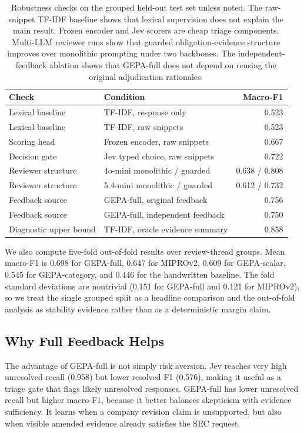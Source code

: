 \documentclass[11pt]{article}
\begin{document}
\begin{table}[t]
\centering
\scriptsize
\setlength{\tabcolsep}{3pt}
\begin{tabular}{llr}
\toprule
\textbf{Check} & \textbf{Condition} & \textbf{Macro-F1} \\
\midrule
Lexical baseline & TF-IDF, response only & 0.523 \\
Lexical baseline & TF-IDF, raw snippets & 0.523 \\
Scoring head & Frozen encoder, raw snippets & 0.667 \\
Decision gate & Jev typed choice, raw snippets & 0.722 \\
Reviewer structure & 4o-mini monolithic / guarded & 0.638 / 0.808 \\
Reviewer structure & 5.4-mini monolithic / guarded & 0.612 / 0.732 \\
Feedback source & GEPA-full, original feedback & 0.756 \\
Feedback source & GEPA-full, independent feedback & 0.750 \\
Diagnostic upper bound & TF-IDF, oracle evidence summary & 0.858 \\
\bottomrule
\end{tabular}
\caption{Robustness checks on the grouped held-out test set unless noted. The raw-snippet TF-IDF baseline shows that lexical supervision does not explain the main result. Frozen encoder and Jev scorers are cheap triage components. Multi-LLM reviewer runs show that guarded obligation-evidence structure improves over monolithic prompting under two backbones. The independent-feedback ablation shows that GEPA-full does not depend on reusing the original adjudication rationales.}
\label{tab:robustness}
\end{table}

We also compute five-fold out-of-fold results over review-thread groups. Mean macro-F1 is 0.698 for GEPA-full, 0.647 for MIPROv2, 0.609 for GEPA-scalar, 0.545 for GEPA-category, and 0.446 for the handwritten baseline. The fold standard deviations are nontrivial (0.151 for GEPA-full and 0.121 for MIPROv2), so we treat the single grouped split as a headline comparison and the out-of-fold analysis as stability evidence rather than as a deterministic margin claim.

\subsection{Why Full Feedback Helps}

The advantage of GEPA-full is not simply risk aversion. Jev reaches very high unresolved recall (0.958) but lower resolved F1 (0.576), making it useful as a triage gate that flags likely unresolved responses. GEPA-full has lower unresolved recall but higher macro-F1, because it better balances skepticism with evidence sufficiency. It learns when a company revision claim is unsupported, but also when visible amended evidence already satisfies the SEC request.
\end{document}
